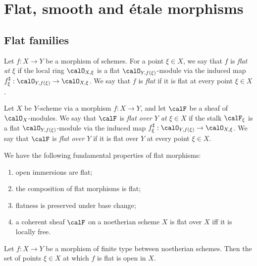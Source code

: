 \section{Flat, smooth and \'etale morphisms}


\subsection{Flat families}

    \begin{definition}\label{def:flat_morphisms}
        Let \(f:X\to Y\) be a morphism of schemes. 
        For a point \(\xi \in X\), we say that \(f\) is \emph{flat at \(\xi\)} if the local ring \(\calO_{X,\xi}\) is a flat \(\calO_{Y,f(\xi)}\)-module via the induced map \(f^\sharp_\xi:\calO_{Y,f(\xi)}\to \calO_{X,\xi}\).
        We say that \(f\) is \emph{flat} if it is flat at every point \(\xi \in X\).
    \end{definition}

    \begin{definition}\label{def:flat_sheaves_over_base}
        Let \(X\) be \(Y\)-scheme via a morphism \(f:X\to Y\), and let \(\calF\) be a sheaf of \(\calO_X\)-modules.
        We say that \(\calF\) is \emph{flat over \(Y\) at \(\xi \in X\)} if the stalk \(\calF_\xi\) is a flat \(\calO_{Y,f(\xi)}\)-module via the induced map \(f^\sharp_\xi:\calO_{Y,f(\xi)}\to \calO_{X,\xi}\).
        We say that \(\calF\) is \emph{flat over \(Y\)} if it is flat over \(Y\) at every point \(\xi \in X\).
    \end{definition}

    \begin{proposition}\label{prop:fundamental_properties_of_flat_morphism}
        We have the following fundamental properties of flat morphisms:
        \begin{enumerate}
            \item open immersions are flat;
            \item the composition of flat morphisms is flat;
            \item flatness is preserved under base change;
            \item a coherent sheaf \(\calF\) on a noetherian scheme \(X\) is flat over \(X\) iff it is locally free.
        \end{enumerate}
    \end{proposition}

    \begin{proposition}\label{prop:openness_of_flat_locus}
        Let \(f:X\to Y\) be a morphism of finite type between noetherian schemes.
        Then the set of points \(\xi \in X\) at which \(f\) is flat is open in \(X\).
    \end{proposition}

